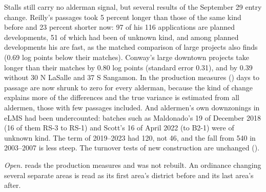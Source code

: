 Stalls still carry no alderman signal, but several results of the September 29 entry change. Reilly's passages took 5
percent longer than those of the same kind before and 23 percent shorter now: 97 of his 116 applications are planned
developments, 51 of which had been of unknown kind, and among planned developments his are fast, as the matched
comparison of large projects also finds (0.69 log points below their matches). Conway's large downtown projects take
longer than their matches by 0.80 log points (standard error 0.31), and by 0.39 without 30 N LaSalle and 37 S
Sangamon. In the production measures () days to passage are now shrunk
to zero for every alderman, because the kind of change explains more of the differences and the true variance is
estimated from all aldermen, those with few passages included. And aldermen's own downzonings in eLMS had been
undercounted: batches such as Maldonado's 19 of December 2018 (16 of them RS-3 to RS-1) and Scott's 16 of April 2022
(to B2-1) were of unknown kind. The term of 2019--2023 had 120, not 46, and the fall from 540 in 2003--2007 is less
steep. The turnover tests of new construction are unchanged ().

\textit{Open.}  reads the production measures and was not rebuilt. An ordinance
changing several separate areas is read as its first area's district before and its last area's after.
